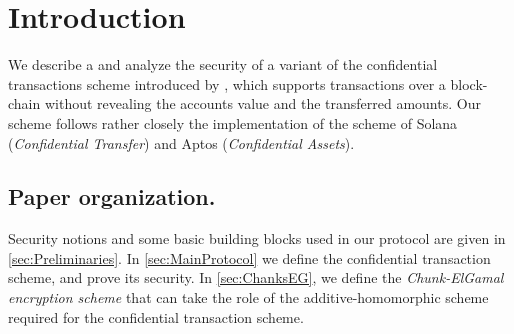 \section{Introduction}\label{sec:Introduction}
We describe a and analyze the security of  a variant of the confidential transactions   scheme introduced by  \citet{BunzAZB20}, which  supports transactions over  a block-chain without revealing the accounts value and the transferred amounts.   Our scheme follows rather closely the  implementation  of the scheme of  Solana (\textit{Confidential Transfer}) and Aptos (\textit{Confidential Assets}). 



\subsection*{Paper organization.} Security notions  and some  basic building blocks used in our protocol are given in \cref{sec:Preliminaries}. In \cref{sec:MainProtocol} we define the confidential transaction scheme, and prove its security.  
In \cref{sec:ChanksEG}, we define   the \textit{Chunk-ElGamal  encryption scheme} that can take the role of the additive-homomorphic scheme required for the confidential transaction scheme.